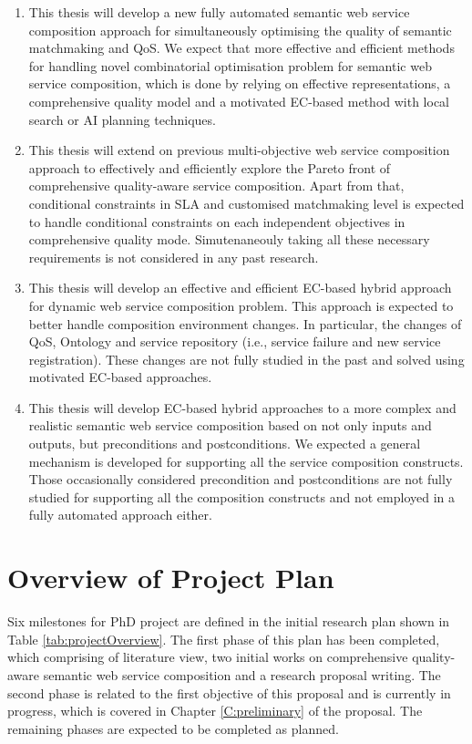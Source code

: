 \begin{enumerate}
 \item This thesis will develop a new fully automated semantic web service composition approach for simultaneously optimising the quality of semantic matchmaking and QoS. We expect that more effective and efficient methods for handling novel combinatorial optimisation problem for semantic web service composition, which is done by relying on effective representations, a comprehensive quality model and a motivated EC-based method with local search or AI planning techniques.

\item This thesis will extend on previous multi-objective web service composition approach to effectively and efficiently explore the Pareto front of comprehensive quality-aware service composition. Apart from that, conditional constraints in SLA and customised matchmaking level is expected to handle conditional constraints on each independent objectives in comprehensive quality mode. Simutenaneouly taking all these necessary requirements is not considered in any past research. 

\item This thesis will develop an effective and efficient EC-based hybrid approach for dynamic web service composition problem. This approach is expected to better handle composition environment changes. In particular, the changes of QoS, Ontology and service repository (i.e., service failure and new service registration). These changes are not fully studied in the past and solved using motivated EC-based approaches.

\item This thesis will develop EC-based hybrid approaches to a more complex and realistic semantic web service composition based on not only inputs and outputs, but preconditions and postconditions. We expected a general mechanism is developed for supporting all the service composition constructs. Those occasionally considered precondition and postconditions are not fully studied for supporting all the composition constructs and not employed in a fully automated approach either.
\end{enumerate}

\section{Overview of Project Plan}

Six milestones for PhD project are defined in the initial research plan shown in Table \ref{tab:projectOverview}. The first phase of this plan has been completed, which comprising of literature view, two initial works on comprehensive quality-aware semantic web service composition and a research proposal writing. The second phase is related to the first objective of this proposal and is currently in progress, which is covered in Chapter \ref{C:preliminary} of the proposal. The remaining phases are expected to be completed as planned.

